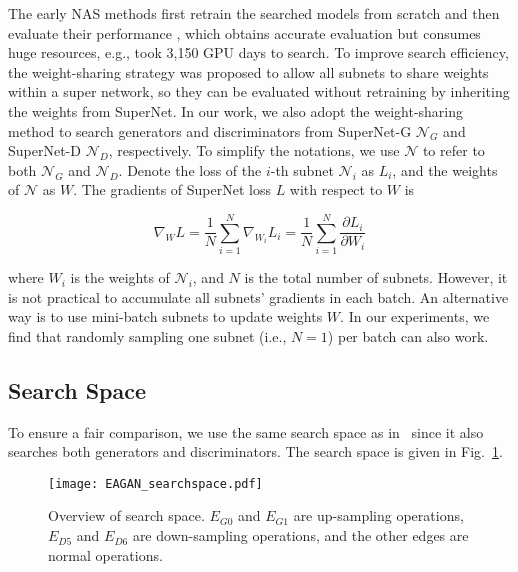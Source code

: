 \documentclass[runningheads]{llncs}
\begin{document}
The early NAS methods first retrain the searched models from scratch and then evaluate their performance \cite{nas2016,amoebanet}, which obtains accurate evaluation but consumes huge resources, e.g., \cite{amoebanet} took 3,150 GPU days to search. To improve search efficiency, the weight-sharing strategy \cite{enas} was proposed to allow all subnets to share weights within a super network, so they can be evaluated without retraining by inheriting the weights from SuperNet. In our work, we also adopt the weight-sharing method to search generators and discriminators from SuperNet-G $\mathcal{N}_G$ and SuperNet-D $\mathcal{N}_D$, respectively. To simplify the notations, we use $\mathcal{N}$ to refer to both $\mathcal{N}_G$ and $\mathcal{N}_D$. Denote the loss of the $i$-th subnet $\mathcal{N}_i$ as $L_i$, and the weights of $\mathcal{N}$ as $W$. The gradients of SuperNet loss $L$ with respect to $W$ is


\begin{equation}
    \nabla_{W}L = \frac{1}{N}\sum_{i=1}^N\nabla_{W_i}L_i = \frac{1}{N}\sum_{i=1}^N\frac{\partial L_i}{\partial W_i}
\end{equation}


\noindent where $W_i$ is the weights of $\mathcal{N}_i$, and $N$ is the total number of subnets. However, it is not practical to accumulate all subnets' gradients in each batch. An alternative way is to use mini-batch subnets to update weights $W$. In our experiments, we find that randomly sampling one subnet (i.e., $N=1$) per batch can also work.


\subsection{Search Space}\label{sec:searchspace}

To ensure a fair comparison, we use the same search space as in~\cite{Adversarialnas} since it also searches both generators and discriminators. The search space is given in Fig.~\ref{fig:searchspace}.











\begin{figure}
    \centering
    \texttt{[image: EAGAN\_searchspace.pdf]}
    \caption{Overview of search space. $E_{G0}$ and $E_{G1}$ are up-sampling operations, $E_{D5}$ and $E_{D6}$ are down-sampling operations, and the other edges are normal operations.}
    \label{fig:searchspace}
\end{figure}
\end{document}
